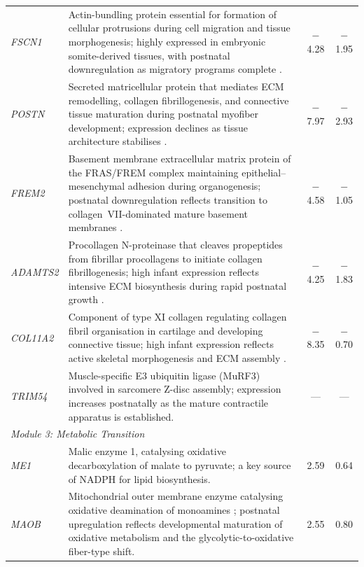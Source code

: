\begin{landscape}
\begin{table}[p]
\begin{tabularx}{\linewidth}{lXcc}
    \textit{FSCN1} & Actin-bundling protein essential for formation of cellular protrusions during cell migration and tissue morphogenesis; highly expressed in embryonic somite-derived tissues, with postnatal downregulation as migratory programs complete \parencite{adams_roles_2004}. & $-$4.28 & $-$1.95 \\

    \textit{POSTN} & Secreted matricellular protein that mediates ECM remodelling, collagen fibrillogenesis, and connective tissue maturation during postnatal myofiber development; expression declines as tissue architecture stabilises \parencite{ozdemir_periostin_2014}. & $-$7.97 & $-$2.93 \\

    \textit{FREM2} & Basement membrane extracellular matrix protein of the FRAS/FREM complex maintaining epithelial--mesenchymal adhesion during organogenesis; postnatal downregulation reflects transition to collagen~VII-dominated mature basement membranes \parencite{kiyozumi_breakdown_2006}. & $-$4.58 & $-$1.05 \\

    \textit{ADAMTS2} & Procollagen N-proteinase that cleaves propeptides from fibrillar procollagens to initiate collagen fibrillogenesis; high infant expression reflects intensive ECM biosynthesis during rapid postnatal growth \parencite{colige_cdna_1997}. & $-$4.25 & $-$1.83 \\

    \textit{COL11A2} & Component of type XI collagen regulating collagen fibril organisation in cartilage and developing connective tissue; high infant expression reflects active skeletal morphogenesis and ECM assembly \parencite{sun_collagen_2020}. & $-$8.35 & $-$0.70 \\

    \textit{TRIM54} & Muscle-specific E3 ubiquitin ligase (MuRF3) involved in sarcomere Z-disc assembly; expression increases postnatally as the mature contractile apparatus is established. & --- & --- \\
    \midrule
    \multicolumn{4}{l}{\textit{Module 3: Metabolic Transition}} \\
    \textit{ME1} & Malic enzyme 1, catalysing oxidative decarboxylation of malate to pyruvate; a key source of NADPH for lipid biosynthesis. & 2.59 & 0.64 \\

    \textit{MAOB} & Mitochondrial outer membrane enzyme catalysing oxidative deamination of monoamines \parencite{shih_monoamine_1999}; postnatal upregulation reflects developmental maturation of oxidative metabolism and the glycolytic-to-oxidative fiber-type shift. & 2.55 & 0.80 \\


\end{tabularx}
\end{table}
\end{landscape}
